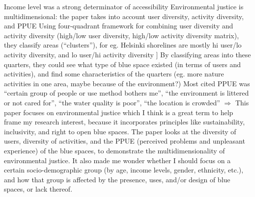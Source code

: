 \documentclass{article}
\begin{document}
\begin{outline}
		\2 Income level was a strong determinator of accessibility
	\1 Environmental justice is multidimensional: the paper takes into account user diversity, activity diversity, and PPUE
		\2 Using four-quadrant framework for combining user diversity and activity diversity (high/low user diversity, high/low activity diversity matrix), they classify areas (``clusters''), for eg. Helsinki shorelines are mostly hi user/lo activity diversity, and lo user/hi activity diversity ]
		\2 By classifying areas into these quarters, they could see what type of blue space existed (in terms of users and activities), and find some characteristics of the quarters (eg. more nature activities in one area, maybe because of the environment?)
	\1 Most cited PPUE was ``certain group of people or use method bothers me'', ``the environment is littered or not cared for'', ``the water quality is poor'', ``the location is crowded''
	\1 $\Rightarrow$ This paper focuses on environmental justice which I think is a great term to help frame my research interest, because it incorporates principles like sustainability, inclusivity, and right to open blue spaces. The paper looks at the diversity of users, diversity of activities, and the PPUE (perceived problems and unpleasant experience) of the blue spaces, to demonstrate the multidimensionality of environmental justice. It also made me wonder whether I should focus on a certain socio-demographic group (by age, income levels, gender, ethnicity, etc.), and  how that group is affected by the presence, uses, and/or design of blue spaces, or lack thereof. 

\end{outline}


\printbibliography
\end{document}
